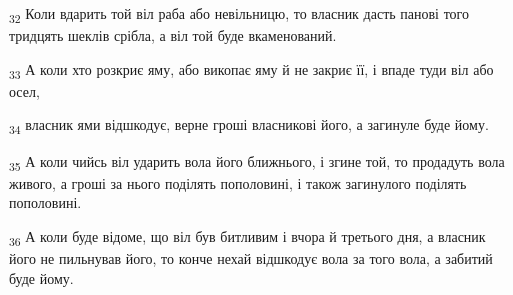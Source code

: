 \begin{tcolorbox}
\textsubscript{32} Коли вдарить той віл раба або невільницю, то власник дасть панові того тридцять шеклів срібла, а віл той буде вкаменований.
\end{tcolorbox}
\begin{tcolorbox}
\textsubscript{33} А коли хто розкриє яму, або викопає яму й не закриє її, і впаде туди віл або осел,
\end{tcolorbox}
\begin{tcolorbox}
\textsubscript{34} власник ями відшкодує, верне гроші власникові його, а загинуле буде йому.
\end{tcolorbox}
\begin{tcolorbox}
\textsubscript{35} А коли чийсь віл ударить вола його ближнього, і згине той, то продадуть вола живого, а гроші за нього поділять пополовині, і також загинулого поділять пополовині.
\end{tcolorbox}
\begin{tcolorbox}
\textsubscript{36} А коли буде відоме, що віл був битливим і вчора й третього дня, а власник його не пильнував його, то конче нехай відшкодує вола за того вола, а забитий буде йому.
\end{tcolorbox}
